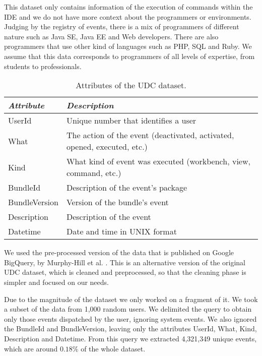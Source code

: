 This dataset only contains information of the execution of commands within the IDE and we do not have more context about the programmers or environments. Judging by the registry of events, there is a mix of programmers of different nature such as Java SE, Java EE and Web developers. There are also programmers that use other kind of languages such as PHP, SQL and Ruby. We assume that this data corresponds to programmers of all levels of expertise, from students to professionals.


\begin{table}[ht!]
	\small
	\caption{Attributes of the UDC dataset. }
	\label{tbl:att_udc}
	\centering
	\begin{tabular}{p{2.5cm}|p{7cm}} 
		\hline 
		\emph{Attribute} & \emph{Description} \\  
		\hline 
		\hline 
		UserId &  Unique number that identifies a user \\
		\hline
		What & The action of the event (deactivated, activated, opened, executed, etc.)  \\
		\hline
		Kind & What kind of event was executed (workbench, view, command, etc.)  \\
		\hline
		BundleId & Description of the event's package  \\
		\hline
		BundleVersion & Version of the bundle's event  \\
		\hline
		Description & Description of the event\\
		\hline
		Datetime & Date and time in UNIX format\\
		\hline
	\end{tabular}
	
\end{table}

We used the pre-processed version of the data that is published on Google BigQuery, by Murphy-Hill et al. \cite{SnipesETALASD}. This is an alternative version of the original UDC dataset, which is cleaned and preprocessed, so that the cleaning phase is simpler and focused on our needs. 

Due to the magnitude of the dataset we only worked on a fragment of it. We took a subset of the data from 1,000 random users. We delimited the query to obtain only those events dispatched by the user, ignoring system events. We also ignored the BundleId and BundleVersion, leaving only the attributes UserId, What, Kind, Description and Datetime. From this query we extracted 4,321,349 unique events, which are around $0.18\%$ of the whole dataset.

